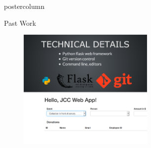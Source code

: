 \documentclass{beamer}
\begin{document}
\begin{frame}
\begin{columns}
\begin{column}{.33\textwidth}
\begin{beamercolorbox}[center,wd=\textwidth]{postercolumn}
\begin{minipage}[T]{.95\textwidth}
{\begin{myblock}{Past Work}
\begin{addmargin}[1em]{1em}
\begin{figure}
                                \centering\includegraphics[width=0.59\textwidth]{img/web_app_wcc.png}
                                \vspace{.5cm}
                            \end{figure}
                        \end{addmargin}
                        

\end{myblock}}
\end{minipage}
\end{beamercolorbox}
\end{column}
\end{columns}
\end{frame}
\end{document}
